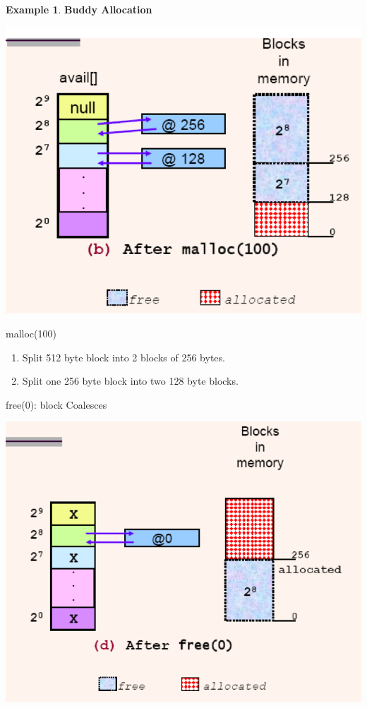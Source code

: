\documentclass[11pt,a4paper]{article}
\theoremstyle{definition}
\newtheorem{example}{Example}[section]
\newenvironment{myenumerate}
{ \begin{enumerate}
    \setlength{\itemsep}{5pt}
    \setlength{\parskip}{0pt}
    \setlength{\parsep}{0pt}     }
{ \end{enumerate}                }
\begin{document}
\begin{example}{\textbf{Buddy Allocation}}

\begin{minipage}{0.3\linewidth}
	\includegraphics[width=\linewidth]{m4/buddyAllocation2}
\end{minipage}
\begin{minipage}{0.3\linewidth}
	\textsf{malloc(100)}
	
	\begin{myenumerate}
		\item Split 512 byte block into 2 blocks of 256 bytes.
		\item Split one 256 byte block into two 128 byte blocks.
	\end{myenumerate}
	
	\textsf{free(0)}: block Coalesces
\end{minipage}
\begin{minipage}{0.3\linewidth}
	\includegraphics[width=\linewidth]{m4/buddyAllocation3}
\end{minipage}

	
\end{example}















\end{document}
